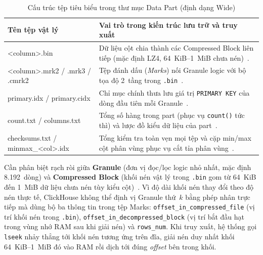 \documentclass[13pt,a4paper]{report}
\begin{document}
\begin{table}[!htb]
\centering
\footnotesize
\renewcommand{\arraystretch}{1.14}
\caption{Cấu trúc tệp tiêu biểu trong thư mục Data Part (định dạng Wide)}
\label{tab:data_part_files}
\begin{tabularx}{\textwidth}{>{\ttfamily\raggedright\arraybackslash}p{4.35cm} >{\raggedright\arraybackslash}X}
\toprule
\textrm{\textbf{Tên tệp vật lý}} & \textbf{Vai trò trong kiến trúc lưu trữ và truy xuất} \\
\midrule
<column>.bin & Dữ liệu cột chia thành các Compressed Block liên tiếp (mặc định LZ4, 64~KiB--1~MiB chưa nén)~\cite{S3}. \\
\addlinespace[3pt]
<column>.mrk2 / .mrk3 / .cmrk2 & Tệp đánh dấu (\textit{Marks}) nối Granule logic với bộ tọa độ 2~tầng trong \texttt{.bin}~\cite{S4}. \\
\addlinespace[3pt]
primary.idx / primary.cidx & Chỉ mục chính thưa lưu giá trị \texttt{PRIMARY KEY} của dòng đầu tiên mỗi Granule~\cite{S4}. \\
\addlinespace[3pt]
count.txt / columns.txt & Tổng số hàng trong part (phục vụ \texttt{count()} tức thì) và lược đồ kiểu dữ liệu của part~\cite{S3}. \\
\addlinespace[3pt]
checksums.txt / minmax\_<col>.idx & Tổng kiểm tra toàn vẹn mọi tệp và cặp min/max cột phân vùng phục vụ cắt tỉa phân vùng~\cite{S2, S3}. \\
\bottomrule
\end{tabularx}
\end{table}

Cần phân biệt rạch ròi giữa \textbf{Granule} (đơn vị đọc/lọc logic nhỏ nhất, mặc định 8.192~dòng) và \textbf{Compressed Block} (khối nén vật lý trong \texttt{.bin} gom từ 64~KiB đến 1~MiB dữ liệu chưa nén tùy kiểu cột)~\cite{A1, S4}. Vì độ dài khối nén thay đổi theo độ nén thực tế, ClickHouse không thể định vị Granule thứ~$k$ bằng phép nhân trực tiếp mà dùng bộ ba thông tin trong tệp Marks: \texttt{offset\_\allowbreak{}in\_\allowbreak{}compressed\_\allowbreak{}file} (vị trí khối nén trong \texttt{.bin}), \texttt{offset\_\allowbreak{}in\_\allowbreak{}decompressed\_\allowbreak{}block} (vị trí bắt đầu hạt trong vùng nhớ RAM sau khi giải nén) và \texttt{rows\_\allowbreak{}num}. Khi truy xuất, hệ thống gọi \texttt{lseek} nhảy thẳng tới khối nén tương ứng trên đĩa, giải nén duy nhất khối 64~KiB--1~MiB đó vào RAM rồi dịch tới đúng \textit{offset} bên trong khối.
\end{document}
